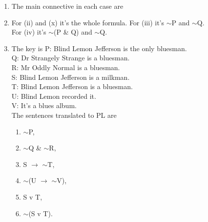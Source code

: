 \documentclass[a4paper,12pt]{article}
\newcommand{\mra}{$\rightarrow$ }
\newcommand{\ms}{$\sim$}
\begin{document}
    \begin{enumerate}[label=\arabic*,leftmargin=*]
        \item The main connective in each case are
            \nopagebreak

        \item For (ii) and (x) it's the whole formula. For (iii) it's \ms P and \ms Q.\\
            For (iv) it's \ms (P \& Q) and \ms Q.

        \item The key is
            P: Blind Lemon Jefferson is the only bluesman.\\
            Q: Dr Strangely Strange is a bluesman.\\
            R: Mr Oddly Normal is a bluesman.\\
            S: Blind Lemon Jefferson is a milkman.\\
            T: Blind Lemon Jefferson is a bluesman.\\
            U: Blind Lemon recorded it.\\
            V: It's a blues album.\\
            The sentences translated to PL are

            \begin{enumerate}[label=(\roman*)]
                \item \ms P,
                \item \ms Q \& \ms R,
                \item S \mra \ms T,
                \item \ms (U \mra \ms V),
                \item S v T,
                \item \ms (S v T).
            \end{enumerate}


\end{enumerate}
\end{document}
